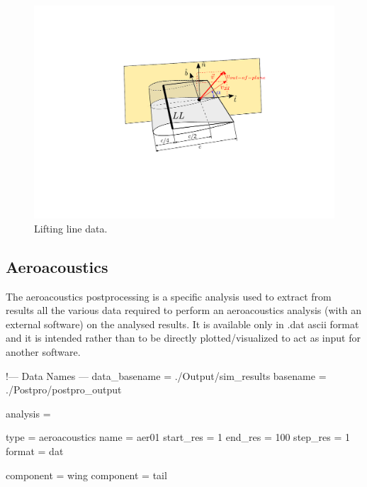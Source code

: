 \begin{figure}[h]
\centering
\includegraphics[width=1.0\textwidth, trim = 100 180 100 145, clip]{./images/ll_output_2} 
\caption{Lifting line data.}
\label{fig:ll_output}
\end{figure}



\subsection{Aeroacoustics}
The aeroacoustics postprocessing is a specific analysis used to extract from results all the various data required to perform an aeroacoustics analysis (with an external software) on the analysed results. It is available only in .dat ascii format  and it is intended rather than to be directly plotted/visualized to act as input for another software.

\begin{inputfile}[frame=single, caption={dust\_post.in for aeroacoustics}, label={file:dust_post.in_aeroacoustics}]
!--- Data Names ---
data_basename = ./Output/sim_results
basename =     ./Postpro/postpro_output

analysis = {

type = aeroacoustics
name = aer01
start_res = 1
end_res   = 100 
step_res  = 1
format = dat

component = wing
component = tail

}
\end{inputfile}

